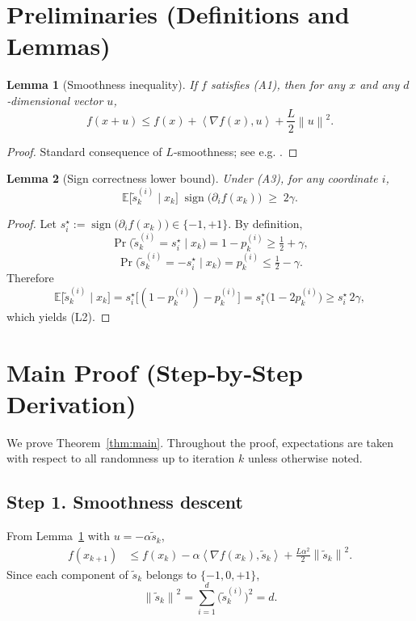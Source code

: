 \documentclass{article}
\newtheorem{lemma}{Lemma}
\newcommand{\sign}{\operatorname{sign}}
\newcommand{\E}{\mathbb{E}}
\newcommand{\norm}[1]{\left\|#1\right\|}
\newcommand{\ip}[2]{\left\langle #1,#2\right\rangle}
\begin{document}
\newpage

\section*{Preliminaries (Definitions and Lemmas)}
\begin{lemma}[Smoothness inequality]\label{lem:smooth}
If $f$ satisfies (A1), then for any $x$ and any $d$‑dimensional vector $u$,
\[
f(x+u)\le f(x)+\ip{\nabla f(x)}{u}+\frac{L}{2}\norm{u}^{2}.
\tag{L1}
\]
\end{lemma}
\begin{proof}
Standard consequence of $L$‑smoothness; see e.g. \cite{nesterov2004introductory}. \qedhere
\end{proof}

\begin{lemma}[Sign correctness lower bound]\label{lem:sign}
Under (A3), for any coordinate $i$,
\[
\E\!\bigl[\tilde{s}_k^{(i)}\mid x_k\bigr]\;\sign\bigl(\partial_i f(x_k)\bigr)
\;\ge\;2\gamma .
\tag{L2}
\]
\end{lemma}
\begin{proof}
Let $s_i^{\star}:=\sign\bigl(\partial_i f(x_k)\bigr)\in\{-1,+1\}$.  
By definition,
\[
\Pr\!\bigl(\tilde{s}_k^{(i)}=s_i^{\star}\mid x_k\bigr)=1-p_{k}^{(i)}\ge \tfrac12+\gamma,
\]
\[
\Pr\!\bigl(\tilde{s}_k^{(i)}=-s_i^{\star}\mid x_k\bigr)=p_{k}^{(i)}\le \tfrac12-\gamma.
\]
Therefore
\[
\E\!\bigl[\tilde{s}_k^{(i)}\mid x_k\bigr]
= s_i^{\star}\bigl[(1-p_{k}^{(i)})-p_{k}^{(i)}\bigr]
= s_i^{\star}\bigl(1-2p_{k}^{(i)}\bigr)
\ge s_i^{\star}\,2\gamma,
\]
which yields (L2). \qedhere
\end{proof}

\section*{Main Proof (Step‑by‑Step Derivation)}
We prove Theorem~\ref{thm:main}.  Throughout the proof, expectations are taken with respect to all randomness up to iteration $k$ unless otherwise noted.

\subsection*{Step 1. Smoothness descent}
From Lemma~\ref{lem:smooth} with $u=-\alpha\tilde{s}_k$,
\begin{align}
f(x_{k+1})
&\le f(x_k)-\alpha\ip{\nabla f(x_k)}{\tilde{s}_k}
    +\frac{L\alpha^{2}}{2}\norm{\tilde{s}_k}^{2}.
\tag{S1}
\end{align}
Since each component of $\tilde{s}_k$ belongs to $\{-1,0,+1\}$,
\[
\norm{\tilde{s}_k}^{2}= \sum_{i=1}^{d}\bigl(\tilde{s}_k^{(i)}\bigr)^{2}=d.
\tag{S2}
\]
\end{document}
